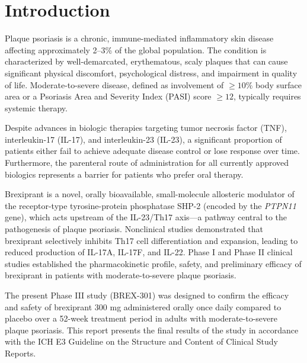 \section{Introduction}

Plaque psoriasis is a chronic, immune-mediated inflammatory skin disease affecting approximately 2--3\% of the global population. The condition is characterized by well-demarcated, erythematous, scaly plaques that can cause significant physical discomfort, psychological distress, and impairment in quality of life. Moderate-to-severe disease, defined as involvement of $\ge 10\%$ body surface area or a Psoriasis Area and Severity Index (PASI) score $\ge 12$, typically requires systemic therapy.

\vspace{4pt}
Despite advances in biologic therapies targeting tumor necrosis factor (TNF), interleukin-17 (IL-17), and interleukin-23 (IL-23), a significant proportion of patients either fail to achieve adequate disease control or lose response over time. Furthermore, the parenteral route of administration for all currently approved biologics represents a barrier for patients who prefer oral therapy.

\vspace{4pt}
Brexiprant is a novel, orally bioavailable, small-molecule allosteric modulator of the receptor-type tyrosine-protein phosphatase SHP-2 (encoded by the \textit{PTPN11} gene), which acts upstream of the IL-23/Th17 axis---a pathway central to the pathogenesis of plaque psoriasis. Nonclinical studies demonstrated that brexiprant selectively inhibits Th17 cell differentiation and expansion, leading to reduced production of IL-17A, IL-17F, and IL-22. Phase I and Phase II clinical studies established the pharmacokinetic profile, safety, and preliminary efficacy of brexiprant in patients with moderate-to-severe plaque psoriasis.

\vspace{4pt}
The present Phase III study (BREX-301) was designed to confirm the efficacy and safety of brexiprant 300 mg administered orally once daily compared to placebo over a 52-week treatment period in adults with moderate-to-severe plaque psoriasis. This report presents the final results of the study in accordance with the ICH E3 Guideline on the Structure and Content of Clinical Study Reports.

\newpage

